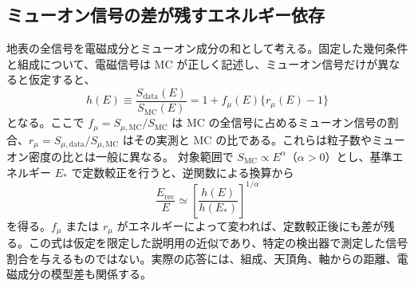 \documentclass[book,paper=a4,fontsize=11pt]{jlreq}
\begin{document}
\subsection{ミューオン信号の差が残すエネルギー依存}
地表の全信号を電磁成分とミューオン成分の和として考える。固定した幾何条件と組成について、電磁信号は MC が正しく記述し、ミューオン信号だけが異なると仮定すると、
\begin{equation}
  h(E)\equiv\frac{S_{\mathrm{data}}(E)}{S_{\mathrm{MC}}(E)}
  =1+f_\mu(E)\{r_\mu(E)-1\}
  \label{eq:muon_signal_ratio}
\end{equation}
となる。ここで \(f_\mu=S_{\mu,\mathrm{MC}}/S_{\mathrm{MC}}\) は MC の全信号に占めるミューオン信号の割合、\(r_\mu=S_{\mu,\mathrm{data}}/S_{\mu,\mathrm{MC}}\) はその実測と MC の比である。これらは粒子数やミューオン密度の比とは一般に異なる。
対象範囲で \(S_{\mathrm{MC}}\propto E^\alpha\)（\(\alpha>0\)）とし、基準エネルギー \(E_*\) で定数較正を行うと、逆関数による換算から
\begin{equation}
  \frac{E_{\mathrm{rec}}}{E}
  \simeq\left[\frac{h(E)}{h(E_*)}\right]^{1/\alpha}
  \label{eq:residual_energy_bias}
\end{equation}
を得る。\(f_\mu\) または \(r_\mu\) がエネルギーによって変われば、定数較正後にも差が残る。この式は仮定を限定した説明用の近似であり、特定の検出器で測定した信号割合を与えるものではない。実際の応答には、組成、天頂角、軸からの距離、電磁成分の模型差も関係する。
\end{document}

